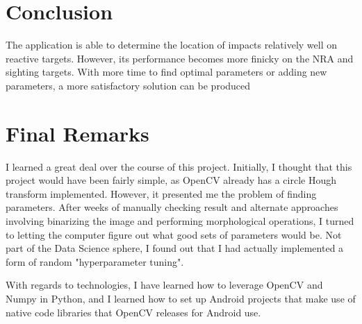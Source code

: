 \documentclass{article}
\begin{document}
\section{Conclusion}
\label{sec:conclusion}
The application is able to determine the location of impacts relatively well on reactive targets.
However, its performance becomes more finicky on the NRA and sighting targets. With more time
to find optimal parameters or adding new parameters, a more satisfactory solution can be produced

\section{Final Remarks}
\label{sec:remarks}
I learned a great deal over the course of this project. Initially, I thought that this project
would have been fairly simple, as OpenCV already has a circle Hough transform implemented.
However, it presented me the problem of finding parameters. After weeks of manually checking result
and alternate approaches involving binarizing the image and performing morphological operations,
I turned to letting the computer figure out what good sets of parameters would be. Not part of
the Data Science sphere, I found out that I had actually implemented a form of random
"hyperparameter tuning".

With regards to technologies, I have learned how to leverage OpenCV and Numpy in Python, and I
learned how to set up Android projects that make use of native code libraries that OpenCV
releases for Android use.



\end{document}
